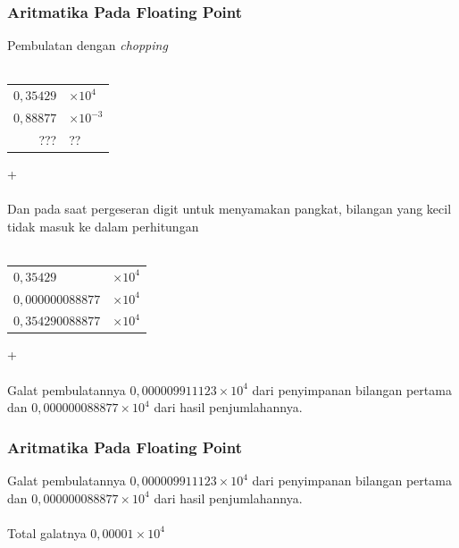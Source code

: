 \documentclass{beamer}
\begin{document}
\begin{frame}
\frametitle{Aritmatika Pada Floating Point}
Pembulatan dengan \textit{chopping} 
\\\ \\\begin{tabular}{rl}
	$0,35429$ & $\times10^4$\\
	$0,88877$ & $\times10^{-3}$\\
	\hline
	??? & ??\\
\end{tabular}+
\\\ \\Dan pada saat pergeseran digit untuk menyamakan pangkat, bilangan yang kecil tidak masuk ke dalam perhitungan
\\\ \\\begin{tabular}{ll}
	$0,35429$ & $\times10^4$\\
	$0,000000088877$ & $\times10^{4}$\\
	\hline
	$0,354290088877$ & $\times10^4$\\
\end{tabular}+
\\\ \\Galat pembulatannya $0,000009911123\times10^4$ dari penyimpanan bilangan pertama dan $0,000000088877\times10^{4}$ dari hasil penjumlahannya.
\end{frame}


\begin{frame}
\frametitle{Aritmatika Pada Floating Point}
Galat pembulatannya $0,000009911123\times10^4$ dari penyimpanan bilangan pertama dan $0,000000088877\times10^{4}$ dari hasil penjumlahannya.
\\\ \\Total galatnya $0,00001\times 10^{4}$

\end{frame}

\end{document}
